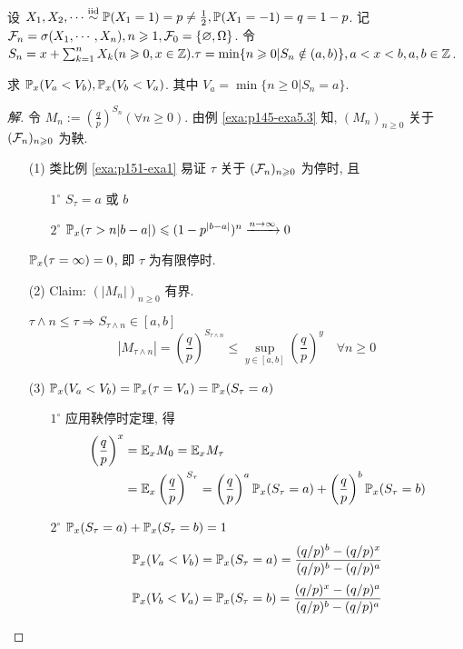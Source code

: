 \begin{example}[不公平赌博的赌徒破产]
    设 $X_1,X_2,\cdots \overset{\text{iid}}{\sim} \mathbb{P}(X_1=1)=p\neq \frac{1}{2}, \mathbb{P}(X_1=-1)=q=1-p$. 记 $\mathcal{F}_n=\sigma(X_1,\cdots,X_n),n\geqslant 1,\mathcal{F}_0=\{\varnothing,\Omega\}$. 令 $S_n=x+\sum_{k=1}^n X_k (n\geqslant 0, x\in \mathbb{Z}). \tau=\min\{n\geqslant 0|S_n\notin (a,b)\}, a<x<b, a,b\in \mathbb{Z}$.

    求 $\mathbb{P}_x(V_a<V_b), \mathbb{P}_x(V_b<V_a)$. 其中 $V_a=\min\{n\geq 0| S_n=a\}$.
\end{example}

\begin{proof}[解]
令 $M_n:=(\frac{q}{p})^{S_n}(\forall n\geq 0)$. 由例 \ref{exa:p145-exa5.3} 知, $(M_n)_{n\geq 0}$ 关于 $(\mathcal{F}_n)_{n\geqslant 0}$ 为鞅.
\begin{enumerate}
    \item[(1)] 类比例 \ref{exa:p151-exa1} 易证 $\tau$ 关于 $(\mathcal{F}_n)_{n\geqslant 0}$ 为停时, 且
    \begin{enumerate}
        \item[$1^{\circ}$] $S_{\tau}=a$ 或 $b$
        \item[$2^{\circ}$] $\mathbb{P}_x(\tau>n|b-a|)\leqslant (1-p^{|b-a|})^n\xrightarrow{n\to\infty}0$  
    \end{enumerate}
    $\mathbb{P}_x(\tau=\infty)=0$, 即 $\tau$ 为有限停时.
    \item[(2)] Claim: $(|M_n|)_{n\geq 0}$ 有界.
    
    $\tau\land n\leq \tau\Rightarrow S_{\tau\land n}\in [a,b]$
    \[
    |M_{\tau\land n}|=\left(\frac{q}{p}\right)^{S_{\tau\land n}}\leq \sup_{y\in [a,b]}\left(\frac{q}{p}\right)^y\quad \forall n\geq 0
    \]
    \item[(3)] $\mathbb{P}_x(V_a<V_b)=\mathbb{P}_x(\tau=V_a)=\mathbb{P}_x(S_{\tau}=a)$
    \begin{enumerate}
        \item[$1^{\circ}$] 应用鞅停时定理, 得
        \[
        \begin{aligned}
            \left(\frac{q}{p}\right)^x &=\mathbb E_x M_0 =\mathbb E_x M_{\tau}\\
            &=\mathbb E_x \left(\frac{q}{p}\right)^{S_{\tau}}=\left(\frac{q}{p}\right)^a\mathbb{P}_x(S_{\tau}=a)+\left(\frac{q}{p}\right)^b\mathbb{P}_x(S_{\tau}=b)
        \end{aligned}
        \]
        \item[$2^{\circ}$] $\mathbb{P}_x(S_{\tau}=a)+\mathbb{P}_x(S_{\tau}=b)=1$
        \[
        \mathbb{P}_x(V_a<V_b)=\mathbb{P}_x(S_{\tau}=a)=\frac{(q/p)^b-(q/p)^x}{(q/p)^b-(q/p)^a}
        \]
        \[
        \mathbb{P}_x(V_b<V_a)=\mathbb{P}_x(S_{\tau}=b)=\frac{(q/p)^x-(q/p)^a}{(q/p)^b-(q/p)^a}
        \]
    \end{enumerate}
\end{enumerate}
\end{proof}

